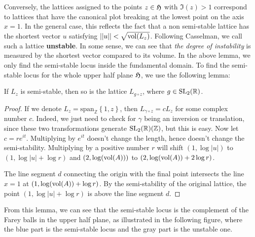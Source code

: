 Conversely, the lattices assigned to the points $z \in \operatorname{\mathfrak{H}}$ with $\Im(z)>1$ correspond to lattices
that have the canonical plot breaking at the lowest point on the axis $x=1$. In the general case, this reflects the fact that
a non semi-stable lattice has the shortest vector $u$ satisfying $||u||<\sqrt{\operatorname{vol}(L_z)}$. Following Casselman,
we call such a lattice \textbf{unstable}. In some sense, we can see that \textit{the degree of instability} is measured
by the shortest vector compared to its volume. In the above lemma, we only find the semi-stable locus inside the fundamental domain.
To find the semi-stable locus for the whole upper half plane $\operatorname{\mathfrak{H}}$, we use the following lemma:
\begin{lemma}
  If $L_z$ is semi-stable, then so is the lattice $L_{g \circ z}$, where $g \in \operatorname{SL_2(\mathbb{R})}$.
\end{lemma}
\begin{proof}
  If we denote $L_z=\text{span}_\mathbb{Z}\left\lbrace 1,z\right\rbrace$, then $L_{\gamma\circ z} = cL_z$ for some complex number $c$.
  Indeed, we just need to check for $\gamma$ being an inversion or translation, since these two transformations generate $\operatorname{SL_2(\mathbb{R})}(\mathbb{Z})$, but this is easy.
  Now let $c = re^{it}$. Multiplying by $e^{it}$ doesn't change the length, hence doesn't change the semi-stability. Multiplying by a positive number
  $r$ will shift $(1,\log|u|)$ to $(1,\log|u|+\log r)$ and $(2,\log(\operatorname{vol}(A)))$ to $(2,\log(\operatorname{vol}(A))+2\log r)$.


  The line segment $d$ connecting the origin with the final point intersects the line $x=1$ at $(1,\log(\operatorname{vol}(A))+\log r)$. By the semi-stability of the original lattice,
  the point $(1,\log|u|+\log r)$ is above the line segment $d$.
\end{proof}
From this lemma, we can see that the semi-stable locus is the complement of the Farey balls in the upper half plane, as illustrated in the
following figure, where the blue part is the semi-stable locus and the gray part is the unstable one.
